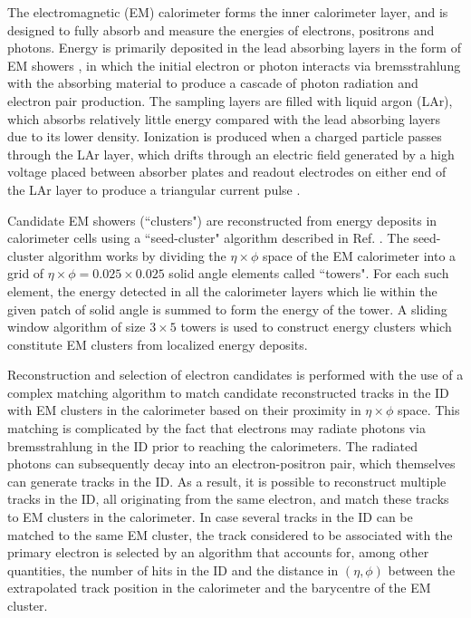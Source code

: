 The electromagnetic (EM) calorimeter forms the inner calorimeter layer, and is designed to fully absorb and measure the energies of electrons, positrons and photons. Energy is primarily deposited in the lead absorbing layers in the form of EM showers \cite{em_showers}, in which the initial electron or photon interacts via bremsstrahlung \cite{shower_theory} with the absorbing material to produce a cascade of photon radiation and electron pair production. The sampling layers are filled with liquid argon (LAr), which absorbs relatively little energy compared with the lead absorbing layers due to its lower density. Ionization is produced when a charged particle passes through the LAr \cite{em_cal} layer, which drifts through an electric field generated by a high voltage placed between absorber plates and readout electrodes on either end of the LAr layer to produce a triangular current pulse \cite{LAr_calo}. 

Candidate EM showers (``clusters") are reconstructed from energy deposits in calorimeter cells using a ``seed-cluster" algorithm described in Ref. \cite{electron_reco}. The seed-cluster algorithm works by dividing the $\eta\times\phi$ space of the EM calorimeter into a grid of $\eta\times\phi=0.025\times0.025$ solid angle elements called ``towers". For each such element, the energy detected in all the calorimeter layers which lie within the given patch of solid angle is summed to form the energy of the tower. A sliding window algorithm of size $3\times5$ towers is used to construct energy clusters which constitute EM clusters from localized energy deposits.

Reconstruction and selection of electron candidates \cite{electron_reco} is performed with the use of a complex matching algorithm to match candidate reconstructed tracks in the ID with EM clusters in the calorimeter based on their proximity in $\eta\times\phi$ space. This matching is complicated by the fact that electrons may radiate photons via bremsstrahlung in the ID prior to reaching the calorimeters. The radiated photons can subsequently decay into an electron-positron pair, which themselves can generate tracks in the ID. As a result, it is possible to reconstruct multiple tracks in the ID, all originating from the same electron, and match these tracks to EM clusters in the calorimeter. In case several tracks in the ID can be matched to the same EM cluster, the track considered to be associated with the primary electron is selected by an algorithm that accounts for, among other quantities, the number of hits in the ID and the distance in $(\eta, \phi)$ between the extrapolated track position in the calorimeter and the barycentre of the EM cluster. 

